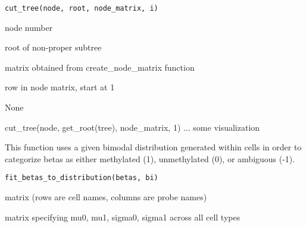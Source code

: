 \documentclass[a4paper]{book}
\begin{document}
%
\begin{Usage}
\begin{verbatim}
cut_tree(node, root, node_matrix, i)
\end{verbatim}
\end{Usage}
%
\begin{Arguments}
\begin{ldescription}
\item[\code{node}] node number

\item[\code{root}] root of non-proper subtree

\item[\code{node\_matrix}] matrix obtained from create\_node\_matrix function

\item[\code{i}] row in node matrix, start at 1
\end{ldescription}
\end{Arguments}
%
\begin{Value}
None
\end{Value}
%
\begin{Examples}
\begin{ExampleCode}
cut_tree(node, get_root(tree), node_matrix, 1)
... some visualization 
\end{ExampleCode}
\end{Examples}
%
\begin{Description}\relax
This function uses a given bimodal distribution generated within cells
in order to categorize betas as either methylated (1), unmethylated (0), or 
ambiguous (-1).
\end{Description}
%
\begin{Usage}
\begin{verbatim}
fit_betas_to_distribution(betas, bi)
\end{verbatim}
\end{Usage}
%
\begin{Arguments}
\begin{ldescription}
\item[\code{betas}] matrix (rows are cell names, columns are probe names)

\item[\code{bi}] matrix specifying mu0, mu1, sigma0, sigma1 across all cell types
\end{ldescription}
\end{Arguments}
\end{document}
